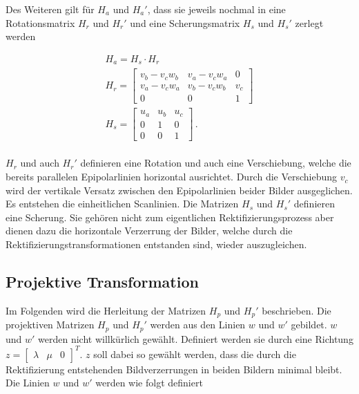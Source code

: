 Des Weiteren gilt für $H_a$ und $H_a'$, dass sie jeweils nochmal in eine Rotationsmatrix $H_r$ und $H_r'$ und eine Scherungsmatrix $H_s$ und $H_s'$ zerlegt werden\cite{ZZ,phdextrinsicPara}


\begin{gather}
	H_a = H_s \cdot H_r\\
	H_r = 
	\begin{bmatrix}
		v_b-v_cw_b&	v_a-v_cw_a&0\\
		v_a-v_cw_a&v_b-v_cw_b&v_c\\
		0&0&1
	\end{bmatrix} \label{eq:DefHr}\\
	H_s = 
	\begin{bmatrix}
		u_a&u_b&u_c\\
		0&1&0\\
		0&0&1
	\end{bmatrix}\label{eq:DefHs} \, .
\end{gather}\\

$H_r$ und auch $H_r'$ definieren eine Rotation und auch eine Verschiebung, welche die bereits parallelen Epipolarlinien horizontal ausrichtet. Durch die Verschiebung $v_c$ wird der vertikale Versatz zwischen den Epipolarlinien beider Bilder ausgeglichen. Es entstehen die einheitlichen Scanlinien. Die Matrizen $H_s$ und $H_s'$ definieren eine Scherung. 
Sie gehören nicht zum eigentlichen Rektifizierungsprozess aber dienen dazu die horizontale Verzerrung der Bilder, welche durch die Rektifizierungstransformationen entstanden sind, wieder auszugleichen. 

%

\subsection{Projektive Transformation}

Im Folgenden wird die Herleitung der Matrizen $H_p$ und $H_p'$ beschrieben. Die projektiven Matrizen $H_p$ und $H_p'$ werden aus den Linien $w$ und $w'$ gebildet. $w$ und $w'$ werden nicht willkürlich gewählt. Definiert werden sie durch eine Richtung $z = \begin{bmatrix}
\lambda&\mu&0\end{bmatrix}^T$. $z$ soll dabei so gewählt werden, dass die durch die Rektifizierung entstehenden Bildverzerrungen in beiden Bildern minimal bleibt. Die Linien $w$ und $w'$ werden wie folgt definiert

